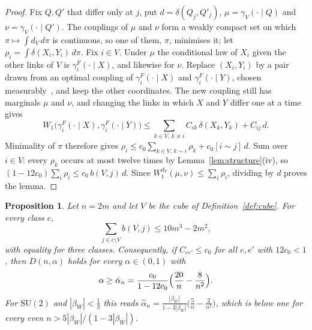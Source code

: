\documentclass[11pt]{amsart}
\newtheorem{proposition}[theorem]{Proposition}
\theoremstyle{definition}
\theoremstyle{remark}
\numberwithin{equation}{section}
\newcommand{\SU}{\mathrm{SU}}
\begin{document}
\begin{proof}
Fix $Q,Q'$ that differ only at $j$, put $d=\delta(Q_j,Q'_j)$,
$\mu=\gamma_V(\cdot\mid Q)$ and $\nu=\gamma_V(\cdot\mid Q')$. The couplings of
$\mu$ and $\nu$ form a weakly compact set on which $\pi\mapsto\int d_V\,d\pi$
is continuous, so one of them, $\pi$, minimises it; let
$\rho_i=\int\delta(X_i,Y_i)\,d\pi$. Fix $i\in V$. Under $\mu$ the conditional
law of $X_i$ given the other links of $V$ is $\gamma^F_i(\cdot\mid X)$, and
likewise for $\nu$. Replace $(X_i,Y_i)$ by a pair drawn from an optimal
coupling of $\gamma^F_i(\cdot\mid X)$ and $\gamma^F_i(\cdot\mid Y)$, chosen
measurably~\cite[Cor.~5.22]{Vil09}, and keep the other coordinates. The new
coupling still has marginals $\mu$ and $\nu$, and changing the links in which
$X$ and $Y$ differ one at a time gives
\[
W_1\bigl(\gamma^F_i(\cdot\mid X),\gamma^F_i(\cdot\mid Y)\bigr)\le
\sum_{k\in V,\,k\ne i}C_{ik}\,\delta(X_k,Y_k)+C_{ij}\,d .
\]
Minimality of $\pi$ therefore gives $\rho_i\le c_0\sum_{k\in V,\,k\sim
i}\rho_k+c_0[i\sim j]\,d$. Sum over $i\in V$: every $\rho_k$ occurs at most
twelve times by Lemma~\ref{lem:structure}(iv), so $(1-12c_0)\sum_i\rho_i\le
c_0\,b(V,j)\,d$. Since $W_1^{d_V}(\mu,\nu)\le\sum_i\rho_i$, dividing by $d$
proves the lemma.
\end{proof}

\begin{proposition}\label{prop:cubesmall}
Let $n=2m$ and let $V$ be the cube of Definition~\ref{def:cube}. For every
class $c$,
\[
\sum_{j\in c\setminus V}b(V,j)\le10m^3-2m^2 ,
\]
with equality for three classes. Consequently, if $C_{ee'}\le c_0$ for all
$e,e'$ with $12c_0<1$, then $D(n,\alpha)$ holds for every $\alpha\in(0,1)$
with
\[
\alpha\ge\hat\alpha_n=\frac{c_0}{1-12c_0}\Bigl(\frac{20}n-\frac8{n^2}\Bigr).
\]
For $\SU(2)$ and $|\beta_W|<\frac13$ this reads $\hat\alpha_n=
\frac{|\beta_W|}{1-3|\beta_W|}\bigl(\frac5n-\frac2{n^2}\bigr)$, which is below
one for every even $n>5|\beta_W|/(1-3|\beta_W|)$.
\end{proposition}
\end{document}
